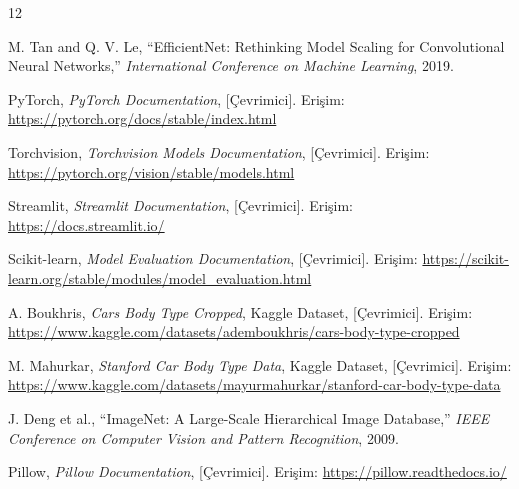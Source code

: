 \documentclass[conference]{IEEEtran}
\begin{document}
\begin{thebibliography}{12}

M. Tan and Q. V. Le, ``EfficientNet: Rethinking Model Scaling for Convolutional Neural Networks,'' \emph{International Conference on Machine Learning}, 2019.

PyTorch, \emph{PyTorch Documentation}, [Çevrimici]. Erişim: \url{https://pytorch.org/docs/stable/index.html}

Torchvision, \emph{Torchvision Models Documentation}, [Çevrimici]. Erişim: \url{https://pytorch.org/vision/stable/models.html}

Streamlit, \emph{Streamlit Documentation}, [Çevrimici]. Erişim: \url{https://docs.streamlit.io/}

Scikit-learn, \emph{Model Evaluation Documentation}, [Çevrimici]. Erişim: \url{https://scikit-learn.org/stable/modules/model_evaluation.html}

A. Boukhris, \emph{Cars Body Type Cropped}, Kaggle Dataset, [Çevrimici]. Erişim: \url{https://www.kaggle.com/datasets/ademboukhris/cars-body-type-cropped}

M. Mahurkar, \emph{Stanford Car Body Type Data}, Kaggle Dataset, [Çevrimici]. Erişim: \url{https://www.kaggle.com/datasets/mayurmahurkar/stanford-car-body-type-data}

J. Deng et al., ``ImageNet: A Large-Scale Hierarchical Image Database,'' \emph{IEEE Conference on Computer Vision and Pattern Recognition}, 2009.

Pillow, \emph{Pillow Documentation}, [Çevrimici]. Erişim: \url{https://pillow.readthedocs.io/}

\end{thebibliography}
\end{document}
